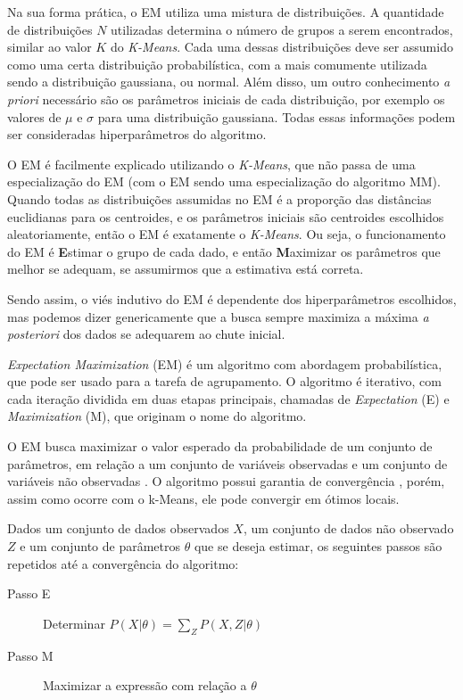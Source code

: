 \documentclass{article}
\begin{document}
Na sua forma prática, o EM utiliza uma mistura de distribuições.
A quantidade de distribuições $N$ utilizadas determina o número de grupos
a serem encontrados, similar ao valor $K$ do {\it K-Means}.
Cada uma dessas distribuições deve ser assumido como uma
certa distribuição probabilística, com a mais comumente utilizada sendo a distribuição gaussiana, ou normal.
Além disso, um outro conhecimento {\it a priori} necessário
são os parâmetros iniciais de cada distribuição, por exemplo os valores de $\mu$ e $\sigma$
para uma distribuição gaussiana.
Todas essas informações podem ser consideradas hiperparâmetros do algoritmo.

O EM é facilmente explicado utilizando o {\it K-Means},
que não passa de uma especialização do EM
(com o EM sendo uma especialização do algoritmo MM).
Quando todas as distribuições assumidas no EM é a
proporção das distâncias euclidianas para os centroides,
e os parâmetros iniciais são centroides escolhidos aleatoriamente,
então o EM é exatamente o {\it K-Means}.
Ou seja, o funcionamento do EM é \textbf{E}stimar o grupo de cada dado,
e então \textbf{M}aximizar os parâmetros que melhor se adequam,
se assumirmos que a estimativa está correta.

Sendo assim, o viés indutivo do EM é dependente dos hiperparâmetros escolhidos,
mas podemos dizer genericamente que a busca sempre maximiza
a máxima {\it a posteriori} dos dados se adequarem ao chute inicial.

{\it Expectation Maximization} (EM) é um algoritmo com abordagem probabilística, que pode ser usado para a tarefa de agrupamento. O algoritmo é iterativo, com cada iteração dividida em duas etapas principais, chamadas de {\it Expectation} (E) e {\it Maximization} (M), que originam o nome do algoritmo.

O EM busca maximizar o valor esperado da probabilidade de um conjunto de parâmetros, em relação a um conjunto de variáveis observadas e um conjunto de variáveis não observadas \cite{Singh}. O algoritmo possui garantia de convergência \cite{DLR1977}, porém, assim como ocorre com o k-Means, ele pode convergir em ótimos locais.

Dados um conjunto de dados observados $X$, um conjunto de dados não observado $Z$ e um conjunto de parâmetros $\theta$ que se deseja estimar, os seguintes passos são repetidos até a convergência do algoritmo:

\begin{description}
\item[Passo E] Determinar $P(X|\theta) = \sum_Z P(X,Z|\theta)$
\item[Passo M] Maximizar a expressão com relação a $\theta$
\end{description}
\end{document}
